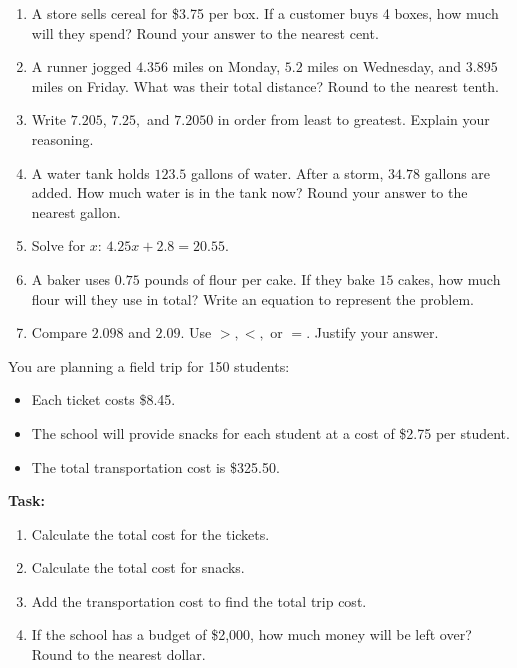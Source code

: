 \documentclass[12pt]{article}
\begin{document}
\begin{tcolorbox}[colframe=black!60, colback=white, 
coltitle=black, colbacktitle=black!15, fonttitle=\bfseries\Large, 
title=Problems, halign title=center, left=10pt, right=10pt, top=10pt, bottom=60pt]
\begin{enumerate}[start=9, itemsep=4em]
    \item A store sells cereal for \$3.75 per box. If a customer buys 4 boxes, how much will they spend? Round your answer to the nearest cent.
    \item A runner jogged \( 4.356 \) miles on Monday, \( 5.2 \) miles on Wednesday, and \( 3.895 \) miles on Friday. What was their total distance? Round to the nearest tenth.
    \item Write \( 7.205 \), \( 7.25, \) and \( 7.2050 \) in order from least to greatest. Explain your reasoning.
    \item A water tank holds \( 123.5 \) gallons of water. After a storm, \( 34.78 \) gallons are added. How much water is in the tank now? Round your answer to the nearest gallon.
    \item Solve for \( x \): \( 4.25x + 2.8 = 20.55 \).
    \item A baker uses \( 0.75 \) pounds of flour per cake. If they bake \( 15 \) cakes, how much flour will they use in total? Write an equation to represent the problem.
    \item Compare \( 2.098 \) and \( 2.09 \). Use \( >, <, \) or \( = \). Justify your answer.
    \vspace{1cm}
\end{enumerate}
\end{tcolorbox}

\vspace{1em}

\begin{tcolorbox}[colframe=black!60, colback=white, 
coltitle=black, colbacktitle=black!15, fonttitle=\bfseries\Large, 
title=Performance Task: Planning a Field Trip, halign title=center, left=10pt, right=10pt, top=10pt, bottom=100pt]
You are planning a field trip for 150 students:
\begin{itemize}
    \item Each ticket costs \$8.45.
    \item The school will provide snacks for each student at a cost of \$2.75 per student.
    \item The total transportation cost is \$325.50.
\end{itemize}
\textbf{Task:}
\begin{enumerate}[itemsep=3em]
    \item Calculate the total cost for the tickets.
    \item Calculate the total cost for snacks.
    \item Add the transportation cost to find the total trip cost.
   
    \item If the school has a budget of \$2,000, how much money will be left over? Round to the nearest dollar.
\end{enumerate}
\end{tcolorbox}
\end{document}
